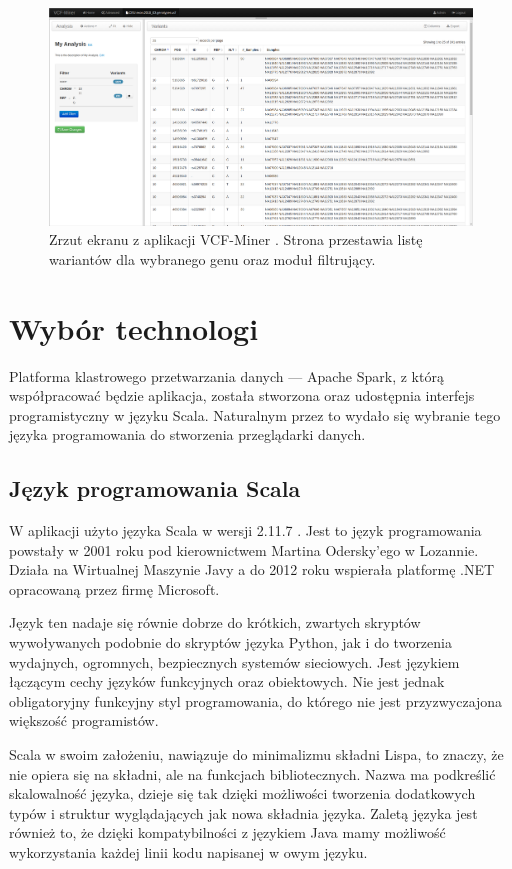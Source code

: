 \documentclass[a4paper,12pt,twoside]{article}
\begin{document}
\begin{figure}[H]
\includegraphics[width=\linewidth]{obrazy/exac/miner.png}
\caption{Zrzut ekranu z aplikacji VCF-Miner \cite{miner}. Strona przestawia listę wariantów dla wybranego genu oraz moduł filtrujący.}
\label{fig:minerpic}
\end{figure}

\newpage
\section{Wybór technologi}

Platforma klastrowego przetwarzania danych — Apache Spark\cite{spark}, z którą współpracować będzie aplikacja, została stworzona oraz udostępnia interfejs programistyczny w języku Scala.
Naturalnym przez to wydało się wybranie tego języka programowania do stworzenia przeglądarki danych.

\subsection{Język programowania Scala}
W aplikacji użyto języka Scala w wersji 2.11.7 \cite{jezykScala}. Jest to język programowania powstały w 2001 roku pod kierownictwem Martina Odersky'ego w Lozannie.
Działa na Wirtualnej Maszynie Javy a do 2012 roku wspierała platformę .NET opracowaną przez firmę Microsoft.

Język ten nadaje się równie dobrze do krótkich, zwartych skryptów wywoływanych podobnie do skryptów języka Python, jak i do tworzenia wydajnych, ogromnych, bezpiecznych systemów sieciowych.
Jest językiem łączącym cechy języków funkcyjnych oraz obiektowych.
Nie jest jednak obligatoryjny funkcyjny styl programowania, do którego nie jest przyzwyczajona większość programistów.

Scala w swoim założeniu, nawiązuje do minimalizmu składni Lispa, to znaczy, że nie opiera się na składni, ale na funkcjach bibliotecznych. Nazwa ma podkreślić skalowalność języka, dzieje się tak dzięki możliwości tworzenia dodatkowych typów i struktur wyglądających jak nowa składnia języka.
Zaletą języka jest również to, że dzięki kompatybilności z językiem Java mamy możliwość wykorzystania każdej linii kodu napisanej w owym języku.
\end{document}
